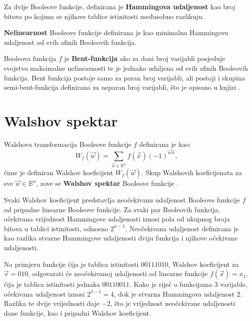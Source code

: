 Za dvije Booleove funkcije, definirana je \textbf{Hammingova udaljenost} kao broj bitova po kojima se njihove tablice istinitosti međusobno razlikuju.

\textbf{Nelinearnost} Booleove funkcije definirana je kao minimalna Hammingova udaljenost od svih afinih Booleovih funkcija.

Booleova funkcija $f$ je \textbf{Bent-funkcija} ako za dani broj varijabli posjeduje svojstvo maksimalne nelinearnosti te je jednako udaljena od svih afinih Booleovih funkcija.
Bent funkcija postoje samo za paran broj varijabli, ali postoji i skupina semi-bent-funkcija definirana za neparan broj varijabli, što je opisano u knjizi \cite{CryptographicBooleanFunctions}.

\section {Walshov spektar}
Walshova transformacija Booleove funkcije $f$ definirana je kao:
\begin{equation}\label{eq:walsh transform}
    W_f(\vec{w}) = \sum_{\vec{x} \in \mathds{B}^n}f(\vec{x})(-1)^{\vec{w}\vec{x}},
\end{equation}
čime je definiran Walshov koeficijent $W_f(\vec{w})$.
Skup Walshovih koeficijenata za sve $\vec{w} \in \mathds{B}^n$, zove se \textbf{Walshov spektar} Booleove funkcije \cite{CryptographicBooleanFunctions}.

Svaki Walshov koeficijent predstavlja neočekivanu udaljenost  \cite{MeasuringBoolean} Booleove funkcije $f$ od pripadne linearne Booleove funkcije.
Za svaki par Booleovih funkcija, očekivana vrijednost Hammingove udaljenosti iznosi pola od ukupnog broja bitova u tablici istinitosti, odnosno $2^{n-1}$.
Neočekivana udaljenost definirana je kao razlika stvarne Hammingove udaljenosti dviju funkcija i njihove očekivane udaljenosti.

Na primjeru funkcije čija je tablica istinitosti $00111010$, Walshov koeficijent za $\vec{v} = 010$, odgovarati će neočekivanoj udaljenosti od linearne funkcije $f(\vec{x}) = x_1$, čija je tablica istinitosti jednaka $00110011$.
Kako je riječ o funkcijama $3$ varijable, očekivana udaljenost iznosi $2^{3-1} = 4$, dok je stvarna Hammingova udaljenost $2$.
Razlika te dvije vrijednosti daje $-2$, što je vrijednost neočekivane udaljenosti dane funkcije, kao i pripadni Walshov koeficijent.

